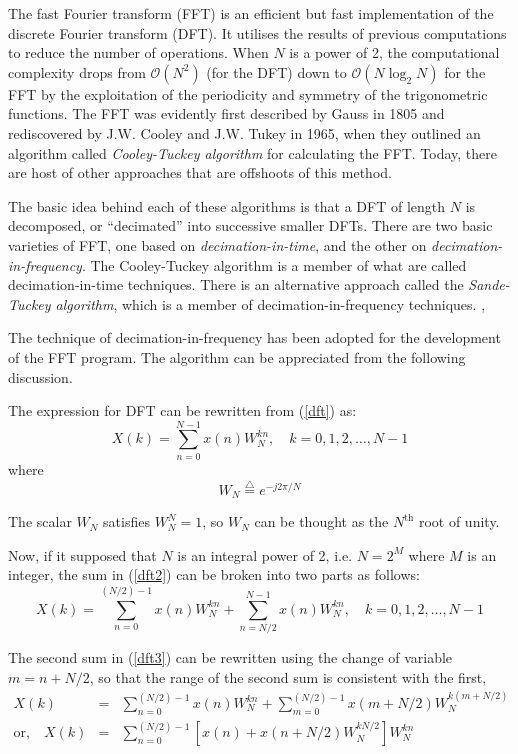\documentclass[a4paper,11pt]{report}
\begin{document}
The fast Fourier transform (FFT) is an efficient but fast implementation of the discrete Fourier transform (DFT). It utilises the results of previous computations to reduce the number of operations. When $N$ is a power of 2, the computational complexity drops from ${\mathcal O}(N^2)$ (for the DFT) down to ${\mathcal O}(N\log_{2} N)$ for the FFT by the exploitation of the periodicity and symmetry of the trigonometric functions. The FFT was evidently first described by Gauss in 1805 and rediscovered by J.W. Cooley and J.W. Tukey in 1965, when they outlined an algorithm called \emph{Cooley-Tuckey algorithm} for calculating the FFT. Today, there are host of other approaches that are offshoots of this method. \cite{schilling}

The basic idea behind each of these algorithms is that a DFT of length $N$ is decomposed, or ``decimated'' into successive smaller DFTs. There are two basic varieties of FFT, one based on \emph{decimation-in-time}, and the other on \emph{decimation-in-frequency}. The Cooley-Tuckey algorithm is a member of what are called decimation-in-time techniques. There is an alternative approach called the \emph{Sande-Tuckey algorithm}, which is a member of decimation-in-frequency techniques. \cite{chapra},\cite{nric}

The technique of decimation-in-frequency has been adopted for the development of the FFT program. The algorithm can be appreciated from the following discussion.

The expression for DFT can be rewritten from (\ref{dft}) as:
\begin{equation} \label{dft2}
X(k) = \sum_{n=0}^{N-1} x(n) W_{N}^{kn}, \quad k=0,1,2,\ldots,N-1
\end{equation}
where 
\begin{equation} \label{wn}
W_{N} \stackrel{\triangle}{=} e^{-j2\pi/N}
\end{equation}

The scalar $W_{N}$ satisfies $W_{N}^{N}=1$, so $W_{N}$ can be thought as the $N^{\mathrm{th}}$ root of unity.

Now, if it supposed that $N$ is an integral power of 2, i.e. $N=2^{M}$ where $M$ is an integer, the sum in (\ref{dft2}) can be broken into two parts as follows: 
\begin{equation} \label{dft3}
X(k) = \sum_{n=0}^{(N/2) - 1} x(n) W_{N}^{kn} + \sum_{n=N/2}^{N-1} x(n) W_{N}^{kn}, \quad k=0,1,2,\ldots,N-1
\end{equation}

The second sum in (\ref{dft3}) can be rewritten using the change of variable $m=n+N/2$, so that the range of the second sum is consistent with the first, 
\begin{eqnarray} 
X(k) & = & \sum_{n=0}^{(N/2) - 1} x(n) W_{N}^{kn} + \sum_{m=0}^{(N/2)-1} x(m+N/2) W_{N}^{k(m+N/2)} \nonumber \\
\textrm{or,}\quad X(k) & = & \sum_{n=0}^{(N/2) - 1} \left[ x(n) + x(n+N/2) W_{N}^{kN/2} \right] W_{N}^{kn} \label{dft4}
\end{eqnarray}
\end{document}
